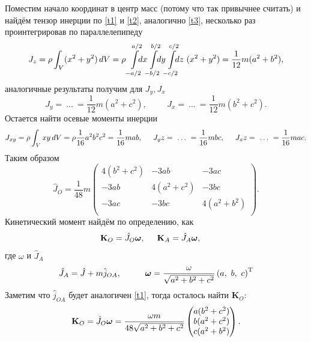 Поместим начало координат в центр масс (потому что так привычнее считать) и найдём тензор инерции по \eqref{t1} и \eqref{t2}, аналогично \eqref{t3}, несколько раз проинтегрировав по параллелепипеду 
\begin{align*}
    J_z = \rho \int_V (x^2 + y^2) \d V = \rho 
    \int\limits_{-a/2}^{a/2} \hspace{-2.5 mm} d x \hspace{-1.0 mm}
    \int\limits_{-b/2}^{b/2} \hspace{-2.5 mm} d y \hspace{-1.0 mm}
    \int\limits_{-c/2}^{c/2} \hspace{-2.5 mm} d z 
    \ (x^2 + y^2) = \frac{1}{12} m (a^2 + b^2),
\end{align*}
аналогичные результаты получим для $J_y, J_x$
\begin{equation*}
    J_y = \ \ldots \ = \frac{1}{12} m (a^2 + c^2),
    \hspace{1cm} 
    J_x = \ \ldots \ = \frac{1}{12} m (b^2 + c^2).
\end{equation*}
Остается найти осевые моменты инерции
\begin{equation*}
    J_{xy} = \rho \int_V x y \, d V = \rho \frac{1}{16} a^2 b^2 c^2 = \frac{1}{16} m a b,
    \hspace{0.5cm} 
    J_yz = \ \ldots \ = \frac{1}{16} mbc,
    \hspace{0.5cm} 
    J_xz = \ \ldots \ = \frac{1}{16} mac.
\end{equation*}
Таким образом
\begin{equation}
    \hat{J}_O = \frac{1}{48} m 
    \begin{pmatrix}
        4(b^2+c^2) & -3ab & -3ac \\
        -3ab & 4(a^2+c^2) & -3bc \\
        -3ac & -3bc & 4(a^2+b^2) \\
    \end{pmatrix}.
\end{equation}
Кинетический момент найдём по определению, как
\begin{equation*}
    \mathbf{K}_O = \hat{J}_O \mbox{\boldmath $\omega$}, \hspace{0.5cm} 
    \mathbf{K}_A = \hat{J}_A \mbox{\boldmath $\omega$}, \hspace{0.5cm} 
\end{equation*}
где $\omega$ и $\hat{J}_A$ 
\begin{equation*}
    \hat{J}_A = \hat{J} + m \hat{j}_{OA},
    \hspace{1cm} 
    \mbox{\boldmath $\omega$} = \frac{\omega}{\sqrt{a^2+b^2+c^2}} 
    \left(a,\ b,\ c\right)^{\text{T}}
\end{equation*}
Заметим что $\hat{j}_{OA}$ будет аналогичен \eqref{t1}, тогда осталось найти $\mathbf{K}_O$:
\begin{equation*}
    \mathbf{K}_O = \hat{J}_O \mbox{\boldmath $\omega$}= \frac{\omega m}{48\sqrt{a^2+b^2+c^2}} 
    \begin{pmatrix}
        a (b^2+c^2) \\
        b (a^2 + c^2) \\
        c (a^2 + b^2) \\
    \end{pmatrix}.
\end{equation*}


